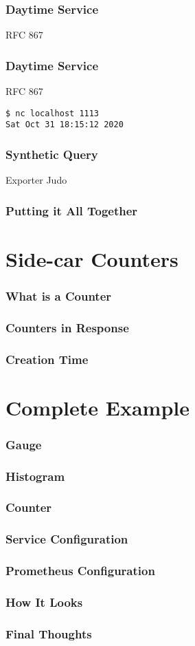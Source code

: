 \begin{frame}
\frametitle{Daytime Service}
RFC 867
\end{frame}

\begin{frame}
\frametitle{Daytime Service}
RFC 867\pause

\begin{lstlisting}
$ nc localhost 1113
Sat Oct 31 18:15:12 2020
\end{lstlisting}

\end{frame}

\begin{frame}
\frametitle{Synthetic Query}
Exporter Judo\pause


\end{frame}

\begin{frame}
\frametitle{Putting it All Together}
\end{frame}

\section{Side-car Counters}

\begin{frame}
\frametitle{What is a Counter}
\end{frame}

\begin{frame}
\frametitle{Counters in Response}
\end{frame}

\begin{frame}
\frametitle{Creation Time}
\end{frame}

\section{Complete Example}

\begin{frame}
\frametitle{Gauge}
\end{frame}

\begin{frame}
\frametitle{Histogram}
\end{frame}

\begin{frame}
\frametitle{Counter}
\end{frame}

\begin{frame}
\frametitle{Service Configuration}
\end{frame}

\begin{frame}
\frametitle{Prometheus Configuration}
\end{frame}

\begin{frame}
\frametitle{How It Looks}
\end{frame}

\begin{frame}
\frametitle{Final Thoughts}
\end{frame}


